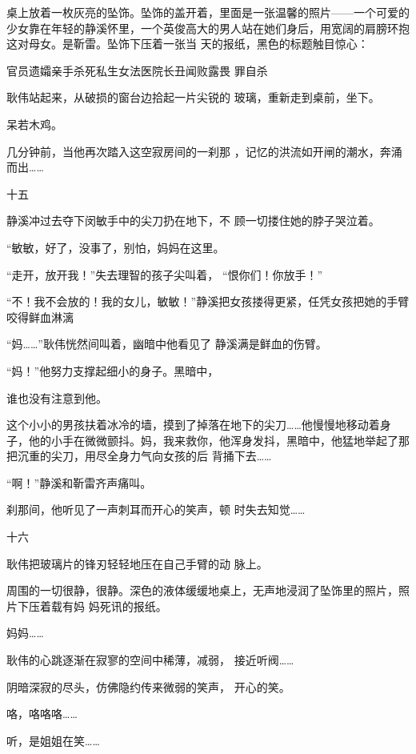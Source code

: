 \documentclass{article}
\begin{document}
桌上放着一枚灰亮的坠饰。坠饰的盖开着，里面是一张温馨的照片——一个可爱的少女靠在年轻的静溪怀里，一个英俊高大的男人站在她们身后，用宽阔的肩膀环抱这对母女。是靳雷。坠饰下压着一张当
天的报纸，黑色的标题触目惊心： 

官员遗孀亲手杀死私生女法医院长丑闻败露畏
罪自杀 

耿伟站起来，从破损的窗台边拾起一片尖锐的
玻璃，重新走到桌前，坐下。 


呆若木鸡。 

\newpage

几分钟前，当他再次踏入这空寂房间的一刹那
，记忆的洪流如开闸的潮水，奔涌而出…… 


十五 

静溪冲过去夺下闵敏手中的尖刀扔在地下，不
顾一切搂住她的脖子哭泣着。 

“敏敏，好了，没事了，别怕，妈妈在这里。

“走开，放开我！”失去理智的孩子尖叫着，
“恨你们！你放手！” 

“不！我不会放的！我的女儿，敏敏！”静溪把女孩搂得更紧，任凭女孩把她的手臂咬得鲜血淋漓

“妈……”耿伟恍然间叫着，幽暗中他看见了
静溪满是鲜血的伤臂。 

“妈！”他努力支撑起细小的身子。黑暗中，

\newpage
谁也没有注意到他。 

这个小小的男孩扶着冰冷的墙，摸到了掉落在地下的尖刀……他慢慢地移动着身子，他的小手在微微颤抖。妈，我来救你，他浑身发抖，黑暗中，他猛地举起了那把沉重的尖刀，用尽全身力气向女孩的后
背捅下去…… 


“啊！”静溪和靳雷齐声痛叫。 

刹那间，他听见了一声刺耳而开心的笑声，顿
时失去知觉…… 


十六 

耿伟把玻璃片的锋刃轻轻地压在自己手臂的动
脉上。 

周围的一切很静，很静。深色的液体缓缓地桌上，无声地浸润了坠饰里的照片，照片下压着载有妈
妈死讯的报纸。 

\newpage


妈妈…… 

耿伟的心跳逐渐在寂寥的空间中稀薄，减弱，
接近听阀…… 

阴暗深寂的尽头，仿佛隐约传来微弱的笑声，
开心的笑。 


咯，咯咯咯…… 

听，是姐姐在笑……
\end{document}
